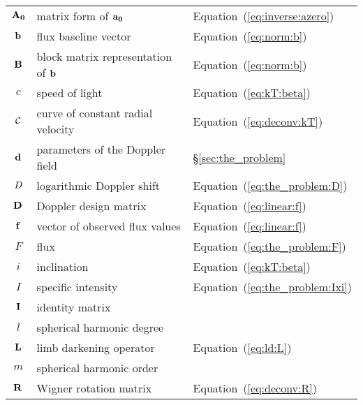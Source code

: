 \documentclass[modern]{aastex62}
\begin{document}
\begin{center}
\begin{longtable}{cll}
    ${\mathbf{A_0}}$             & matrix form of ${\mathbf{a_0}}$                           & Equation~(\ref{eq:inverse:azero})\\
    ${\mathbf{b}}$               & flux baseline vector                                  & Equation~(\ref{eq:norm:b})\\
    ${\mathbf{B}}$               & block matrix representation of ${\mathbf{b}}$             & Equation~(\ref{eq:norm:b})\\
    $c$                      & speed of light                                        & Equation~(\ref{eq:kT:beta})\\
    $\mathcal{C}$                 & curve of constant radial velocity                     & Equation~(\ref{eq:deconv:kT})\\
    ${\mathbf{d}}$                 & parameters of the Doppler field                       & \S\ref{sec:the_problem}\\
    $D$                     & logarithmic Doppler shift                             & Equation~(\ref{eq:the_problem:D})\\
    ${\mathbf{D}}$               & Doppler design matrix                                 & Equation~(\ref{eq:linear:f})\\
    ${\mathbf{f}}$               & vector of observed flux values                        & Equation~(\ref{eq:linear:f})\\
    $F$                      & flux                                                  & Equation~(\ref{eq:the_problem:F})\\
    $i$                      & inclination                                           & Equation~(\ref{eq:kT:beta})\\
    $I$                      & specific intensity                                    & Equation~(\ref{eq:the_problem:Ixi})\\
    ${\mathbf{I}}$               & identity matrix                                       & \\
    $l$                      & spherical harmonic degree                             & \\
    ${\mathbf{L}}$               & limb darkening operator                               & Equation~(\ref{eq:ld:L})\\
    $m$                      & spherical harmonic order                              & \\
    ${\mathbf{R}}$               & Wigner rotation matrix                                & Equation~(\ref{eq:deconv:R})\\

\end{longtable}
\end{center}
\end{document}
